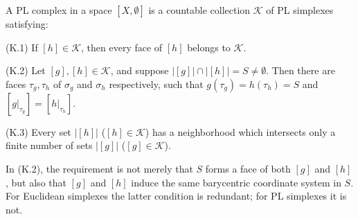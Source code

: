 A PL complex in a space $[X, \emptyset]$ is a countable collection $\mathcal{K}$ of PL simplexes satisfying:

(K.1) If $[h] \in \mathcal{K}$, then every face of $[h]$ belongs to $\mathcal{K}$.

(K.2) Let $[g], [h] \in \mathcal{K}$, and suppose $|[g]| \cap |[h]| = S \neq \emptyset$. Then there are faces $\tau_g, \tau_h$ of $\sigma_g$ and $\sigma_h$ respectively, such that $g(\tau_g) = h(\tau_h) = S$ and $[g|_{\tau_g}] = [h|_{\tau_h}]$.

(K.3) Every set $|[h]|$ ($[h] \in \mathcal{K}$) has a neighborhood which intersects only a finite number of sets $|[g]|$ ($[g] \in \mathcal{K}$).

In (K.2), the requirement is not merely that $S$ forms a face of both $[g]$ and $[h]$, but also that $[g]$ and $[h]$ induce the same barycentric coordinate system in $S$. For Euclidean simplexes the latter condition is redundant; for PL simplexes it is not.
